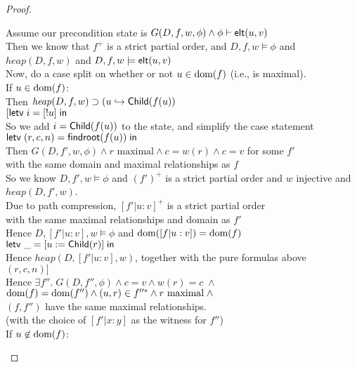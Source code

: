 \begin{proof}
\begin{tabbedproof}
\oo Assume our precondition state is $G(D, f, w, \phi) \land {\phi} \vdash \mathsf{elt}({u}, {v})$ \\
\ooo Then we know that $f^+$ is a strict partial order, and $D,f,w \models \phi$ and \\
\oox $\mathit{heap}(D,f,w)$ and $D,f,w \models \mathsf{elt}({u}, {v})$ \\
\ooo Now, do a case split on whether or not $u \in \mbox{dom}({f})$ (i.e., is maximal). \\
\ooo If $u \in \mbox{dom}({f})$: \\
\oooo Then $\mathit{heap}(D,f,w) \supset (u \hookrightarrow \mathsf{Child}(f(u))$ \\
\oooo $[\mathsf{letv}\;i = [!u]\;\mathsf{in}\;$ \\
\oooo So we add $i = \mathsf{Child}(f(u))$ to the state, and simplify the case statement \\
\oooo $\mathsf{letv}\;(r,c,n) = \mathsf{findroot}(f(u))\;\mathsf{in}\;$ \\
\oooo Then $G(D, f', w, \phi) \land r\mbox{ maximal} \land c = w(r) \land c = v$ for some $f'$ \\
\oooo with the same domain and maximal relationships as $f$\\
\oooo So we know $D, f', w \models \phi$ and $(f')^+$ is a strict partial order and $w$ injective and $\mathit{heap}(D, f', w)$. \\
\oooo Due to path compression, $[f'|u:v]^+$ is a strict partial order \\
\oooox with the same maximal relationships and domain as $f'$\\
\oooo Hence $D, [f'|u:v], w \models \phi$ and $\mbox{dom}({[f|u:v]}) = \mbox{dom}({f})$ \\
\oooo $\mathsf{letv}\;\_ = [u := \mathsf{Child}(r)]\;\mathsf{in}\;$ \\
\oooo Hence $\mathit{heap}(D, [f'|u:v], w)$, together with the pure formulas above \\
\oooo $(r,c,n)]$ \\
\oooo Hence $\exists f''.\;G(D, f'', \phi) \land c = v \land w(r) = c \;\land$ \\
\oooox $\mbox{dom}({f}) = \mbox{dom}({f''}) \land (u,r) \in f''^{*} \land r\mbox{ maximal} \;\land$ \\
\oooox $(f,f'')$ have the same maximal relationships. \\
\ooox (with the choice of $[f'|x:y]$ as the witness for $f''$) \\
\ooo If $u \not\in \mbox{dom}({f})$:  \\

\end{tabbedproof}
\end{proof}
